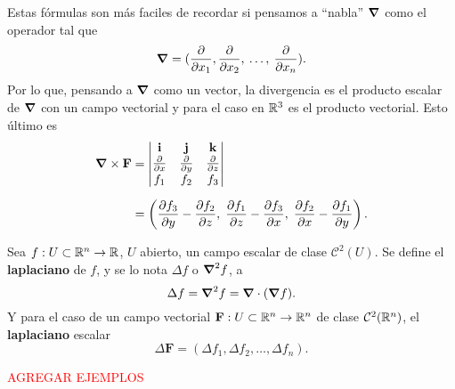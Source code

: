 \begin{obs}
    Estas f\'ormulas son m\'as faciles de recordar si pensamos a ``nabla'' $\grad$ como el operador tal que 
    \[
        \grad = (\frac{\partial}{\partial x_1},\frac{\partial}{\partial x_2},\:\ldots,\: \frac{\partial}{\partial x_n}).  
    \]
    Por lo que, pensando a $\grad$ como un vector, la divergencia es el producto escalar de $\grad$ con un campo vectorial y para el caso en $\mathbb{R}^3$ es el producto vectorial. Esto \'ultimo es
    \begin{align*}
        \grad\times\mathbf{F}&= 
        \begin{vmatrix}
        \mathbf{i} & \mathbf{j} & \mathbf{k} \\
        \frac{\partial}{\partial x} & \frac{\partial}{\partial y} & \frac{\partial}{\partial z} \\
        f_1 & f_2 & f_3
        \end{vmatrix} \\[.2cm]
        &=\left(\frac{\partial f_3}{\partial y}-\frac{\partial f_2}{\partial z},\;\frac{\partial f_1}{\partial z}-\frac{\partial f_3}{\partial x},\;\frac{\partial f_2}{\partial x}-\frac{\partial f_1}{\partial y}\right).
    \end{align*}
\end{obs}
\begin{definition}
    Sea $f:U\subset\mathbb{R}^n\to\mathbb{R}$, $U$ abierto, un campo escalar de clase $\mathcal{C}^2(U)$. Se define el \textbf{laplaciano} de $f$, y se lo nota $\Delta f$ o $\grad^2 f$, a
    \[
        \Delta f=\grad^2f=\grad\cdot(\grad f).  
    \]
    Y para el caso de un campo vectorial $\mathbf{F}:U\subset\mathbb{R}^n\to\mathbb{R}^n$ de clase $\mathcal{C}^2(\mathbb{R}^n)$, el \textbf{laplaciano} escalar
    \[
        \Delta\mathbf{F}=(\Delta f_1,\Delta f_2,\ldots,\Delta f_n). 
    \]
\end{definition}

\textcolor{red}{AGREGAR EJEMPLOS}

